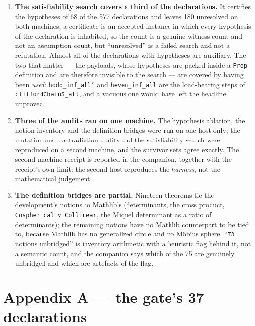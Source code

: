 \documentclass[11pt]{article}
\providecommand{\textquotesingle}{'}
\theoremstyle{definition}
\theoremstyle{remark}
\begin{document}
\begin{enumerate}
  margins against \texttt{triP}, \texttt{cycP} and the transversals were healthy but small. Small residuals do not
  prove exact vanishing. The configuration is bundled with the paper, labelled numerical, and nothing in
  the paper now rests on it: the corner is a theorem, and the configuration's role is only to argue
  against the tempting rank route that was refuted early.
\item
  \textbf{The satisfiability search covers a third of the declarations.} It certifies the hypotheses of 68 of
  the 577 declarations and leaves 180 unresolved on both machines; a certificate is an accepted instance in
  which every hypothesis of the declaration is inhabited, so the count is a genuine witness count and not
  an assumption count, but ``unresolved'' is a failed search and not a refutation. Almost all of the
  declarations with hypotheses are auxiliary. The two that matter --- the payloads, whose hypotheses are packed inside a \texttt{Prop}
  definition and are therefore invisible to the search --- are covered by having been \emph{used}: \texttt{hodd\_inf\_all\textquotesingle{}} and \texttt{heven\_\allowbreak inf\_\allowbreak all} are the load-bearing steps of \texttt{cliffordChainS\_\allowbreak all}, and a
  vacuous one would have left the headline unproved.
\item
  \textbf{Three of the audits ran on one machine.} The hypothesis ablation, the notion inventory and the
  definition bridges were run on one host only; the mutation and contradiction audits and the satisfiability search were
  reproduced on a second machine, and the survivor sets agree exactly. The second-machine receipt is
  reported in the companion, together with the receipt's own limit: the second host reproduces the
  \emph{harness}, not the mathematical judgement.
\item
  \textbf{The definition bridges are partial.} Nineteen theorems tie the development's notions to Mathlib's
  (determinants, the cross product, \texttt{Cospherical\ ∨\ Collinear}, the Miquel determinant as a ratio of
  determinants); the remaining notions have no Mathlib counterpart to be tied to, because Mathlib has no
  generalized circle and no M\"obius sphere. ``75 notions unbridged'' is inventory arithmetic with a
  heuristic flag behind it, not a semantic count, and the companion says which of the 75 are genuinely
  unbridged and which are artefacts of the flag.
\end{enumerate}

\hypertarget{appendix-a-the-gates-37-declarations}{%
\section*{Appendix A --- the gate's 37 declarations}\label{appendix-a-the-gates-37-declarations}}
\end{document}
